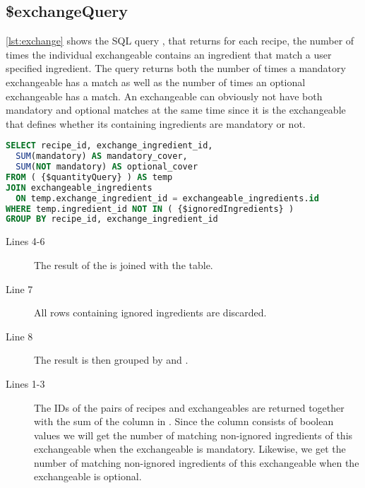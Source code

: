 \subsection*{\$exchangeQuery}
\autoref{lst:exchange} shows the SQL query , that returns for each recipe, the number of times the individual exchangeable contains an ingredient that match a user specified ingredient. The query returns both the number of times a mandatory exchangeable has a match as well as the number of times an optional exchangeable has a match. An exchangeable can obviously not have both mandatory and optional matches at the same time since it is the exchangeable that defines whether its containing ingredients are mandatory or not.
\begin{lstlisting}[language=SQL, float=h, label={lst:exchange}, caption={\$exchangeQuery, returns the number of times the individual exchangeable appear in each recipe.}]
SELECT recipe_id, exchange_ingredient_id,
  SUM(mandatory) AS mandatory_cover,
  SUM(NOT mandatory) AS optional_cover
FROM ( {$quantityQuery} ) AS temp
JOIN exchangeable_ingredients
  ON temp.exchange_ingredient_id = exchangeable_ingredients.id
WHERE temp.ingredient_id NOT IN ( {$ignoredIngredients} )
GROUP BY recipe_id, exchange_ingredient_id
\end{lstlisting}
\begin{description}
\item[Lines 4-6] The result of the  is joined with the  table.
\item[Line 7] All rows containing ignored ingredients are discarded.
\item[Line 8] The result is then grouped by  and .
\item[Lines 1-3] The IDs of the pairs of recipes and exchangeables are returned together with the sum of the  column in . Since the  column consists of boolean values we will get the number of matching non-ignored ingredients of this exchangeable when the exchangeable is mandatory. Likewise, we get the number of matching non-ignored ingredients of this exchangeable when the exchangeable is optional.
\end{description}




